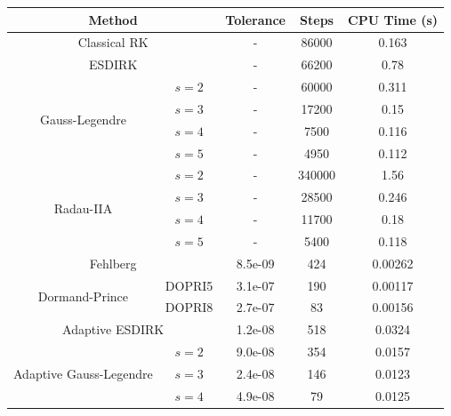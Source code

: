 \documentclass[lang=cn,10pt,bibend=bibtex]{elegantbook}
\begin{document}
\begin{table}[htbp]
  \small
  \centering
  \renewcommand\arraystretch{0.9}
  \begin{tabular}{cc|ccc}
  \multicolumn{2}{c|}{Method}                  & Tolerance & Steps & CPU Time (s) \\ \hline
  \multicolumn{2}{c|}{Classical RK} & - & 86000 & 0.163 \\ \hline
  \multicolumn{2}{c|}{ESDIRK} & - & 66200 & 0.78 \\ \hline
  \multicolumn{1}{c|}{\multirow{4}{*}{Gauss-Legendre}}    & \multicolumn{1}{c|}{$s=2$} & - & 60000 & 0.311\\
  \multicolumn{1}{c|}{}                         & \multicolumn{1}{c|}{$s=3$} & - & 17200 & 0.15  \\
  \multicolumn{1}{c|}{}                         & \multicolumn{1}{c|}{$s=4$} & - & 7500 & 0.116 \\
  \multicolumn{1}{c|}{}                         & \multicolumn{1}{c|}{$s=5$} & - & 4950 & 0.112  \\ \hline
  \multicolumn{1}{c|}{\multirow{4}{*}{Radau-IIA}}    & \multicolumn{1}{c|}{$s=2$} & - & 340000 & 1.56\\
  \multicolumn{1}{c|}{}                         & \multicolumn{1}{c|}{$s=3$} & - & 28500 & 0.246  \\
  \multicolumn{1}{c|}{}                         & \multicolumn{1}{c|}{$s=4$} & - & 11700 & 0.18 \\
  \multicolumn{1}{c|}{}                         & \multicolumn{1}{c|}{$s=5$} & - & 5400 & 0.118  \\ \hline
  \multicolumn{2}{c|}{Fehlberg} & 8.5e-09 & 424 & 0.00262 \\ \hline
  \multicolumn{1}{c|}{\multirow{2}{*}{Dormand-Prince}}    & \multicolumn{1}{c|}{DOPRI5} & 3.1e-07 & 190 & 0.00117\\
  \multicolumn{1}{c|}{}                         & \multicolumn{1}{c|}{DOPRI8} & 2.7e-07 & 83 & 0.00156  \\ \hline
  \multicolumn{2}{c|}{Adaptive ESDIRK} & 1.2e-08 & 518 & 0.0324 \\ \hline
  \multicolumn{1}{c|}{\multirow{4}{*}{Adaptive Gauss-Legendre}}    & \multicolumn{1}{c|}{$s=2$} & 9.0e-08 & 354 & 0.0157\\
  \multicolumn{1}{c|}{}                         & \multicolumn{1}{c|}{$s=3$} & 2.4e-08 & 146 & 0.0123  \\
  \multicolumn{1}{c|}{}                         & \multicolumn{1}{c|}{$s=4$} & 4.9e-08 & 79 & 0.0125 \\

\end{tabular}
\end{table}
\end{document}
